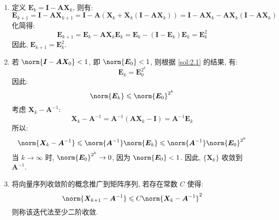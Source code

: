 \documentclass[lang = zh]{iwork}
\begin{document}
\begin{sol} ~
  \begin{enumerate}
    \item \label{sol:2.1} 定义 $\bm{E}_k = \bm{I} - \bm{A} \bm{X}_k$, 则有:
          \begin{equation*}
            \bm{E}_{k+1}
            = \bm{I} - \bm{A} \bm{X}_{k+1}
            = \bm{I} - \bm{A} (\bm{X}_k + \bm{X}_k (\bm{I} - \bm{A} \bm{X}_k))
            = \bm{I} - \bm{A} \bm{X}_k - \bm{A} \bm{X}_k (\bm{I} - \bm{A} \bm{X}_k)
          \end{equation*}
          化简得:
          \begin{equation*}
            \bm{E}_{k+1}
            = \bm{E}_k - \bm{A} \bm{X}_k \bm{E}_k
            = \bm{E}_k - (\bm{I} - \bm{E}_k) \bm{E}_k
            = \bm{E}_k^2
          \end{equation*}
          因此, $\bm{E}_{k+1} = \bm{E}_k^2$.
    \item \label{sol:2.2} 若 $\norm{\bm{I} - \bm{A} \bm{X}_0} < 1$, 即 $\norm{\bm{E}_0} < 1$, 则根据 \ref{sol:2.1} 的结果, 有:
          \begin{equation*}
            \bm{E}_{k} = \bm{E}_0^{2^k}
          \end{equation*}
          因此:
          \begin{equation*}
            \norm{\bm{E}_k} \leqslant \norm{\bm{E}_0}^{2^k}
          \end{equation*}
          考虑 $\bm{X}_k - \bm{A}^{-1}$:
          \begin{equation*}
            \bm{X}_k - \bm{A}^{-1}
            = \bm{A}^{-1} (\bm{A} \bm{X}_k - \bm{I})
            = \bm{A}^{-1} \bm{E}_k
          \end{equation*}
          所以:
          \begin{equation*}
            \norm{\bm{X}_k - \bm{A}^{-1}}
            \leqslant \norm{\bm{A}^{-1}} \norm{\bm{E}_k}
            \leqslant \norm{\bm{A}^{-1}} \norm{\bm{E}_0}^{2^k}
          \end{equation*}
          当 $k \to \infty$ 时, $\norm{\bm{E}_0}^{2^k} \to 0$, 因为 $\norm{\bm{E}_0} < 1$.
          因此, $\{\bm{X}_k\}$ 收敛到 $\bm{A}^{-1}$.
    \item 将向量序列收敛阶的概念推广到矩阵序列, 若存在常数 $C$ 使得:
          \begin{equation*}
            \norm{\bm{X}_{k+1} - \bm{A}^{-1}} \leqslant C \norm{\bm{X}_k - \bm{A}^{-1}}^2
          \end{equation*}
          则称该迭代法至少二阶收敛.

\end{enumerate}
\end{sol}
\end{document}
